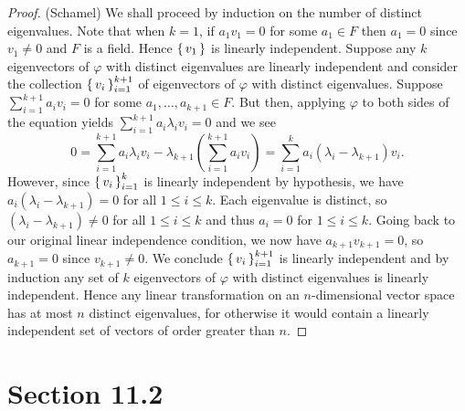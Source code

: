 \documentclass[10pt]{article}
\renewcommand{\phi}{\varphi}
\begin{document}
\begin{itemize}
\begin{proof} (Schamel)
We shall proceed by induction on the number of distinct eigenvalues.  Note that when $k=1$, if $a_1 v_1 = 0$ for some $a_1 \in F$ then $a_1 = 0$ since $v_1 \neq 0$ and $F$ is a field.  Hence $\set{v_1}$ is linearly independent.  Suppose any $k$ eigenvectors of $\phi$ with distinct eigenvalues are linearly independent and consider the collection $\set{v_i}_{i=1}^{k+1}$ of eigenvectors of $\phi$ with distinct eigenvalues.  Suppose $\sum_{i=1}^{k+1} a_i v_i = 0$ for some $a_1,\ldots,a_{k+1} \in F$.  But then, applying $\phi$ to both sides of the equation yields $\sum_{i=1}^{k+1} a_i \lambda_i v_i = 0$ and we see
\[ 0 = \sum_{i=1}^{k+1} a_i \lambda_i v_i - \lambda_{k+1}\left(\sum_{i=1}^{k+1} a_i v_i\right) = \sum_{i=1}^k a_i (\lambda_i-\lambda_{k+1}) v_i. \]
However, since $\set{v_i}_{i=1}^k$ is linearly independent by hypothesis, we have $a_i (\lambda_i - \lambda_{k+1}) = 0$ for all $1 \leq i \leq k$.  Each eigenvalue is distinct, so $(\lambda_i - \lambda_{k+1}) \neq 0$ for all $1 \leq i \leq k$ and thus $a_i = 0$ for $1 \leq i \leq k$.  Going back to our original linear independence condition, we now have $a_{k+1}v_{k+1} = 0$, so $a_{k+1} = 0$ since $v_{k+1} \neq 0$.  We conclude $\set{v_i}_{i=1}^{k+1}$ is linearly independent and by induction any set of $k$ eigenvectors of $\phi$ with distinct eigenvalues is linearly independent.  Hence any linear transformation on an $n$-dimensional vector space has at most $n$ distinct eigenvalues, for otherwise it would contain a linearly independent set of vectors of order greater than $n$.
\end{proof}

\end{itemize}


\section*{Section 11.2}
\end{document}

